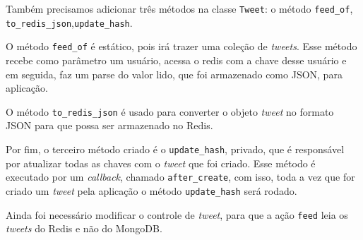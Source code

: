 Também precisamos adicionar três métodos na classe \verb|Tweet|: o método \verb|feed_of|, \verb|to_redis_json|,\verb|update_hash|.

O método \verb|feed_of| é estático, pois irá trazer uma coleção de \textit{tweets}. Esse método recebe como parâmetro um usuário, acessa o redis com a chave desse usuário e em seguida, faz um parse do valor lido, que foi armazenado como JSON, para aplicação.

O método \verb|to_redis_json| é usado para converter o objeto \textit{tweet} no formato JSON para que possa ser armazenado no \ac{Redis}.

Por fim, o terceiro método criado é o \verb|update_hash|, privado, que é responsável por atualizar todas as chaves com o \textit{tweet} que foi criado. Esse método é executado por um \textit{callback}, chamado \verb|after_create|, com isso, toda a vez que for criado um \textit{tweet} pela aplicação o método \verb|update_hash| será rodado.

Ainda foi necessário modificar o controle de \textit{tweet}, para que a ação \verb|feed| leia os \textit{tweets} do \ac{Redis} e não do MongoDB.




